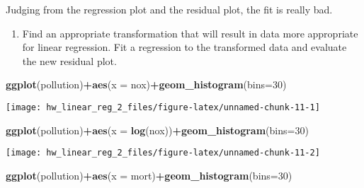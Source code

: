 \documentclass[]{article}
\newenvironment{Shaded}{\begin{snugshade}}{\end{snugshade}}
\newcommand{\DataTypeTok}[1]{\textcolor[rgb]{0.13,0.29,0.53}{#1}}
\newcommand{\DecValTok}[1]{\textcolor[rgb]{0.00,0.00,0.81}{#1}}
\newcommand{\KeywordTok}[1]{\textcolor[rgb]{0.13,0.29,0.53}{\textbf{#1}}}
\newcommand{\NormalTok}[1]{#1}
\newcommand{\OperatorTok}[1]{\textcolor[rgb]{0.81,0.36,0.00}{\textbf{#1}}}
\providecommand{\tightlist}{%
  \setlength{\itemsep}{0pt}\setlength{\parskip}{0pt}}
\begin{document}
Judging from the regression plot and the residual plot, the fit is
really bad.\newline

\begin{enumerate}
\def\labelenumi{\arabic{enumi}.}
\setcounter{enumi}{1}
\tightlist
\item
  Find an appropriate transformation that will result in data more
  appropriate for linear regression. Fit a regression to the transformed
  data and evaluate the new residual plot. \newline
\end{enumerate}

\begin{Shaded}
\begin{Highlighting}[]
\KeywordTok{ggplot}\NormalTok{(pollution)}\OperatorTok{+}\KeywordTok{aes}\NormalTok{(}\DataTypeTok{x =}\NormalTok{ nox)}\OperatorTok{+}\KeywordTok{geom_histogram}\NormalTok{(}\DataTypeTok{bins=}\DecValTok{30}\NormalTok{)}
\end{Highlighting}
\end{Shaded}

\begin{center}\texttt{[image: hw\_linear\_reg\_2\_files/figure-latex/unnamed-chunk-11-1]} \end{center}

\begin{Shaded}
\begin{Highlighting}[]
\KeywordTok{ggplot}\NormalTok{(pollution)}\OperatorTok{+}\KeywordTok{aes}\NormalTok{(}\DataTypeTok{x =} \KeywordTok{log}\NormalTok{(nox))}\OperatorTok{+}\KeywordTok{geom_histogram}\NormalTok{(}\DataTypeTok{bins=}\DecValTok{30}\NormalTok{)}
\end{Highlighting}
\end{Shaded}

\begin{center}\texttt{[image: hw\_linear\_reg\_2\_files/figure-latex/unnamed-chunk-11-2]} \end{center}

\begin{Shaded}
\begin{Highlighting}[]
\KeywordTok{ggplot}\NormalTok{(pollution)}\OperatorTok{+}\KeywordTok{aes}\NormalTok{(}\DataTypeTok{x =}\NormalTok{ mort)}\OperatorTok{+}\KeywordTok{geom_histogram}\NormalTok{(}\DataTypeTok{bins=}\DecValTok{30}\NormalTok{)}
\end{Highlighting}
\end{Shaded}
\end{document}
